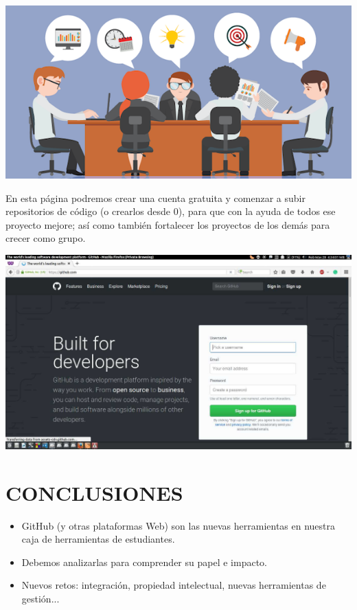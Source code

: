 \begin{center}
\includegraphics[width=14cm]{./Imagenes/imagen4} 
\end{center}

En esta página podremos crear una cuenta gratuita y comenzar a subir repositorios de código (o crearlos desde 0), para que con la ayuda de todos ese proyecto mejore; así como también fortalecer los proyectos de los demás para crecer como grupo.

\begin{center}
\includegraphics[width=14cm]{./Imagenes/imagen5} 
\end{center}

\section{CONCLUSIONES} 
\begin{itemize}
\item GitHub (y otras plataformas Web) son las nuevas herramientas en nuestra caja de herramientas de estudiantes.
\item Debemos analizarlas para comprender su papel e impacto.
\item Nuevos retos: integración, propiedad intelectual, nuevas herramientas de gestión...

\end{itemize}





